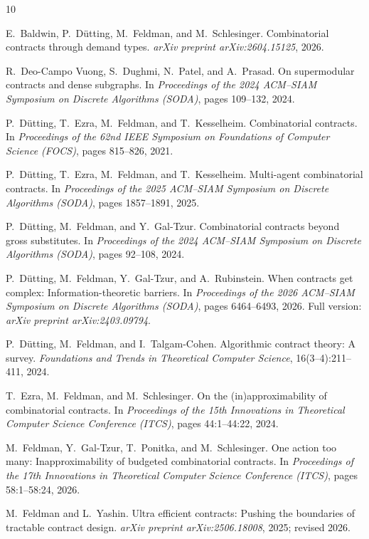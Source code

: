 \documentclass[11pt]{article}
\begin{document}
\begin{thebibliography}{10}

E.~Baldwin, P.~D\"utting, M.~Feldman, and M.~Schlesinger.
\newblock Combinatorial contracts through demand types.
\newblock \emph{arXiv preprint arXiv:2604.15125}, 2026.

R.~Deo-Campo Vuong, S.~Dughmi, N.~Patel, and A.~Prasad.
\newblock On supermodular contracts and dense subgraphs.
\newblock In \emph{Proceedings of the 2024 ACM--SIAM Symposium on Discrete
  Algorithms (SODA)}, pages 109--132, 2024.

P.~D\"utting, T.~Ezra, M.~Feldman, and T.~Kesselheim.
\newblock Combinatorial contracts.
\newblock In \emph{Proceedings of the 62nd IEEE Symposium on Foundations of
  Computer Science (FOCS)}, pages 815--826, 2021.

P.~D\"utting, T.~Ezra, M.~Feldman, and T.~Kesselheim.
\newblock Multi-agent combinatorial contracts.
\newblock In \emph{Proceedings of the 2025 ACM--SIAM Symposium on Discrete
  Algorithms (SODA)}, pages 1857--1891, 2025.

P.~D\"utting, M.~Feldman, and Y.~Gal-Tzur.
\newblock Combinatorial contracts beyond gross substitutes.
\newblock In \emph{Proceedings of the 2024 ACM--SIAM Symposium on Discrete
  Algorithms (SODA)}, pages 92--108, 2024.

P.~D\"utting, M.~Feldman, Y.~Gal-Tzur, and A.~Rubinstein.
\newblock When contracts get complex: Information-theoretic barriers.
\newblock In \emph{Proceedings of the 2026 ACM--SIAM Symposium on Discrete
  Algorithms (SODA)}, pages 6464--6493, 2026.
\newblock Full version: \emph{arXiv preprint arXiv:2403.09794}.

P.~D\"utting, M.~Feldman, and I.~Talgam-Cohen.
\newblock Algorithmic contract theory: A survey.
\newblock \emph{Foundations and Trends in Theoretical Computer Science},
  16(3--4):211--411, 2024.

T.~Ezra, M.~Feldman, and M.~Schlesinger.
\newblock On the (in)approximability of combinatorial contracts.
\newblock In \emph{Proceedings of the 15th Innovations in Theoretical
  Computer Science Conference (ITCS)}, pages 44:1--44:22, 2024.

M.~Feldman, Y.~Gal-Tzur, T.~Ponitka, and M.~Schlesinger.
\newblock One action too many: Inapproximability of budgeted combinatorial
  contracts.
\newblock In \emph{Proceedings of the 17th Innovations in Theoretical
  Computer Science Conference (ITCS)}, pages 58:1--58:24, 2026.

M.~Feldman and L.~Yashin.
\newblock Ultra efficient contracts: Pushing the boundaries of tractable
  contract design.
\newblock \emph{arXiv preprint arXiv:2506.18008}, 2025; revised 2026.

\end{thebibliography}
\end{document}
